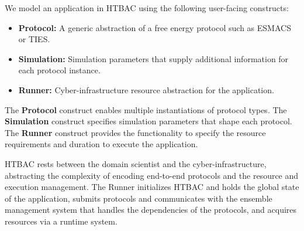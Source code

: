
We model an application in HTBAC using the following user-facing 
constructs:

\begin{itemize}
  \item \textbf{Protocol:} A generic abstraction of a free energy protocol
  such as ESMACS or TIES.
  \item \textbf{Simulation:} Simulation parameters that supply additional
  information for each protocol instance.
  \item \textbf{Runner:} Cyber-infrastructure resource abstraction for the
  application.
\end{itemize}

The \textbf{Protocol} construct  enables multiple instantiations of protocol types. 
The \textbf{Simulation} construct  specifies simulation parameters that shape 
each protocol. The \textbf{Runner} construct provides the functionality to 
specify the resource requirements and duration to execute the application.


HTBAC rests between the domain scientist and the cyber-infrastructure, 
abstracting the complexity of encoding end-to-end protocols and the resource and 
execution management. The Runner initializes HTBAC and holds the global state of 
the application, submits protocols and communicates with the ensemble management 
system that handles the dependencies of the protocols, and acquires resources 
via a runtime system. 






